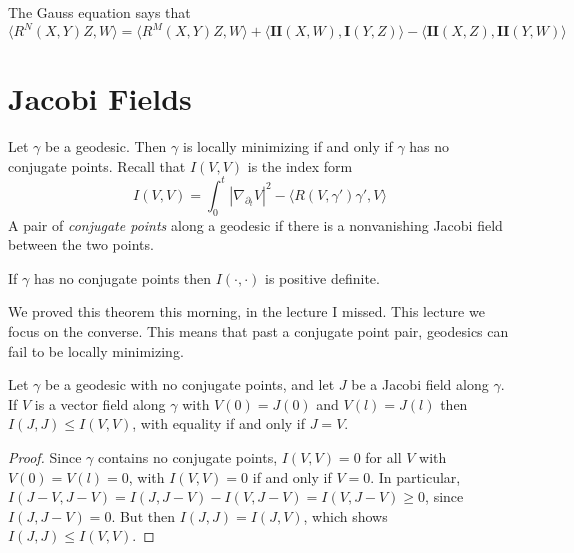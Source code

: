 The Gauss equation says that
%
\[ \langle R^N(X,Y)Z,W \rangle = \langle R^M(X,Y)Z,W \rangle + \langle \mathbf{II}(X,W), \mathbf{I}(Y,Z) \rangle - \langle \mathbf{II}(X,Z), \mathbf{II}(Y,W) \rangle \]


\section{Jacobi Fields}

Let $\gamma$ be a geodesic. Then $\gamma$ is locally minimizing if and only if $\gamma$ has no conjugate points. Recall that $I(V,V)$ is the index form
%
\[ I(V,V) = \int_0^t \left| \nabla_{\partial_t} V \right|^2 - \langle R(V,\gamma') \gamma', V \rangle \]
%
A pair of \emph{conjugate points} along a geodesic if there is a nonvanishing Jacobi field between the two points.

\begin{theorem}
    If $\gamma$ has no conjugate points then $I(\cdot,\cdot)$ is positive definite.
\end{theorem}

We proved this theorem this morning, in the lecture I missed. This lecture we focus on the converse. This means that past a conjugate point pair, geodesics can fail to be locally minimizing.

\begin{theorem}
    Let $\gamma$ be a geodesic with no conjugate points, and let $J$ be a Jacobi field along $\gamma$. If $V$ is a vector field along $\gamma$ with $V(0) = J(0)$ and $V(l) = J(l)$ then $I(J,J) \leq I(V,V)$, with equality if and only if $J = V$.
\end{theorem}
\begin{proof}
    Since $\gamma$ contains no conjugate points, $I(V,V) = 0$ for all $V$ with $V(0) = V(l) = 0$, with $I(V,V) = 0$ if and only if $V = 0$. In particular, $I(J-V,J-V) = I(J,J-V) - I(V,J-V) = I(V,J-V) \geq 0$, since $I(J,J-V) = 0$. But then $I(J,J) = I(J,V)$, which shows $I(J,J) \leq I(V,V)$.
\end{proof}

